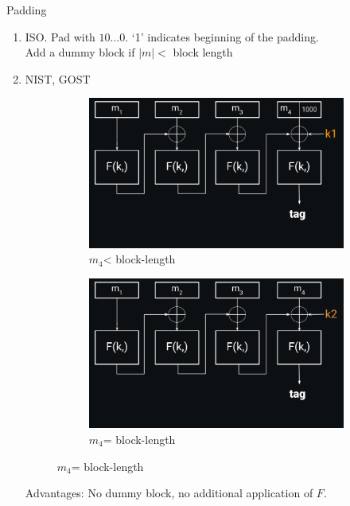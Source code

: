 \documentclass[usenames,dvipsnames, 9pt]{beamer}
\begin{document}
\begin{frame}{Padding}
	\Large
	\begin{enumerate}
		\itemsep1em
		\item {\color{Orange} ISO.} Pad with $10\ldots0$. `1' indicates beginning of the padding. \\
		Add a dummy block if $|m| < $ block length
		\pause 
		\item {\color{Orange} NIST, GOST}  
		\begin{figure}
			\captionsetup[subfigure]{labelformat=empty}
			\begin{subfigure}{.5\textwidth}
				\centering
				\includegraphics[width=.98\textwidth]{CBC_Mac_Padding}
				\caption{$m_4$< block-length}
			\end{subfigure}%
		 \begin{subfigure}{.5\textwidth}
			\centering
			\includegraphics[width=.98\textwidth]{CBC_Mac_Padding_1}
			\caption{$m_4$= block-length}
		\end{subfigure}%
		\end{figure}
		\vspace{1em}
		Advantages: No dummy block, no additional application of $F$.
		 
	\end{enumerate}
\end{frame}
\end{document}
